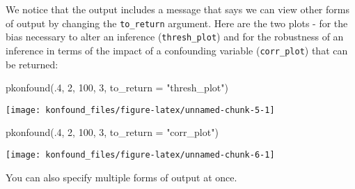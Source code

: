 We notice that the output includes a message that says we can view other
forms of output by changing the \texttt{to\_return} argument. Here are
the two plots - for the bias necessary to alter an inference
(\texttt{thresh\_plot}) and for the robustness of an inference in terms
of the impact of a confounding variable (\texttt{corr\_plot}) that can
be returned:

\begin{Schunk}
\begin{Sinput}
pkonfound(.4, 2, 100, 3, to_return = "thresh_plot")
\end{Sinput}


\begin{center}\texttt{[image: konfound\_files/figure-latex/unnamed-chunk-5-1]} \end{center}

\end{Schunk}

\begin{Schunk}
\begin{Sinput}
pkonfound(.4, 2, 100, 3, to_return = "corr_plot")
\end{Sinput}


\begin{center}\texttt{[image: konfound\_files/figure-latex/unnamed-chunk-6-1]} \end{center}

\end{Schunk}

You can also specify multiple forms of output at once.

